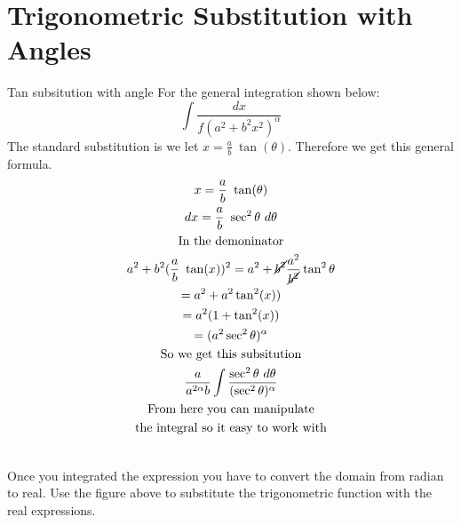 \documentclass[letterpaper,10pt,twoside,twocolumn,openany]{book}
\begin{document}
\section{Trigonometric Substitution with Angles}
\begin{DndSidebar}[]{Tan subsitution with angle}
    For the general integration shown below:
    \begin{equation}
        \int \frac{dx}{f(a^2+b^2x^2)^\alpha}
    \end{equation}
    The standard substitution is we let $x = \frac{a}{b}\ \tan(\theta)$. Therefore we get this general formula.
    \begin{gather*}
        x = \frac{a}{b}\ \tan(\theta)\\
        dx =  \frac{a}{b}\ \sec^2\theta\ d\theta\\
        \text{In the demoninator}\\
        a^2 + b^2(\frac{a}{b}\ \tan(x))^2 = a^2 + \cancel{b^2}\frac{a^2}{\cancel{b^2}}\tan^2\theta\\
        = a^2 + a^2 \tan^2(x))\\
        = a^2(1 + \tan^2(x))\\ 
        = (a^2 \sec^2\theta)^\alpha\\
        \text{So we get this subsitution}\\
        \frac{a}{a^{2\alpha}b} \int \frac{\sec^2\theta\ d\theta}{(\sec^2\theta)^\alpha}\\
        \text{From here you can manipulate}\\
        \text{the integral so it easy to work with}
    \end{gather*}
    \centering
    \\
    Once you integrated the expression you have to convert the domain from radian to real. Use the figure above to substitute the trigonometric function with the real expressions.
\end{DndSidebar}
\end{document}
